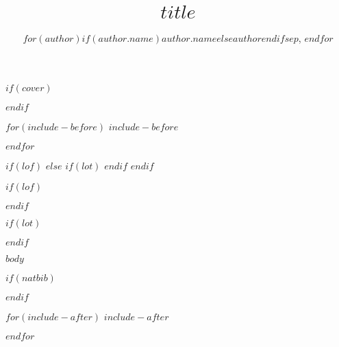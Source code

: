 \documentclass{article}
\title{$title$}
\author{$for(author)$$if(author.name)$$author.name$$else$$author$$endif$$sep$, $endfor$}
\begin{document}
$if(cover)$

$endif$
\maketitle
{}

$for(include-before)$
$include-before$

$endfor$


%
%

$if(lof)$
\clearpage
$else$
  $if(lot)$
\clearpage
  $endif$
$endif$

$if(lof)$
\listoffigures
{}
\vspace{34pt}
$endif$

$if(lot)$
\listoftables
{}
$endif$

\clearpage


$body$

$if(natbib)$
\cleardoublepage

$endif$

$for(include-after)$
$include-after$

$endfor$
\end{document}
